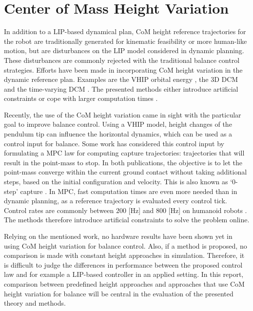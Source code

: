 \section{Center of Mass Height Variation}
In addition to a \ac{LIP}-based dynamical plan, \ac{CoM} height reference trajectories for the robot are traditionally generated for kinematic feasibility \cite{koolen2016design, kuindersma2016optimization} or more human-like motion, but are disturbances on the \ac{LIP} model considered in dynamic planning. These disturbances are commonly rejected with the traditional balance control strategies. Efforts have been made in incorporating \ac{CoM} height variation in the dynamic reference plan. Examples are the \ac{VHIP} orbital energy \cite{pratt2007derivation}, the \ac{3D} \ac{DCM} \cite{englsberger2013three} and the time-varying \ac{DCM} \cite{hopkins2014humanoid}. The presented methods either introduce artificial constraints \cite{pratt2007derivation} or cope with larger computation times \cite{hopkins2014humanoid}.

Recently, the use of the \ac{CoM} height variation came in sight with the particular goal to improve balance control. Using a \ac{VHIP} model, height changes of the pendulum tip can influence the horizontal dynamics, which can be used as a control input for balance. Some work has considered this control input by formulating a \ac{MPC} law \cite{koolen2016balance, caron2018balance} for computing capture trajectories: trajectories that will result in the point-mass to stop. In both publications, the objective is to let the point-mass converge within the current ground contact without taking additional steps, based on the initial configuration and velocity. This is also known as `0-step' capture \cite{koolen2012capturability}. In \ac{MPC}, fast computation times are even more needed than in dynamic planning, as a reference trajectory is evaluated every control tick. Control rates are commonly between $200$ [Hz] and $800$ [Hz] on humanoid robots \cite{koolen2016design, kuindersma2016optimization}. The methods therefore introduce artificial constraints to solve the problem online.

Relying on the mentioned work, no hardware results have been shown yet in using \ac{CoM} height variation for balance control. Also, if a method is proposed, no comparison is made with constant height approaches in simulation. Therefore, it is difficult to judge the differences in performance between the proposed control law and for example a \ac{LIP}-based controller in an applied setting. In this report, comparison between predefined height approaches and approaches that use \ac{CoM} height variation for balance will be central in the evaluation of the presented theory and methods.

